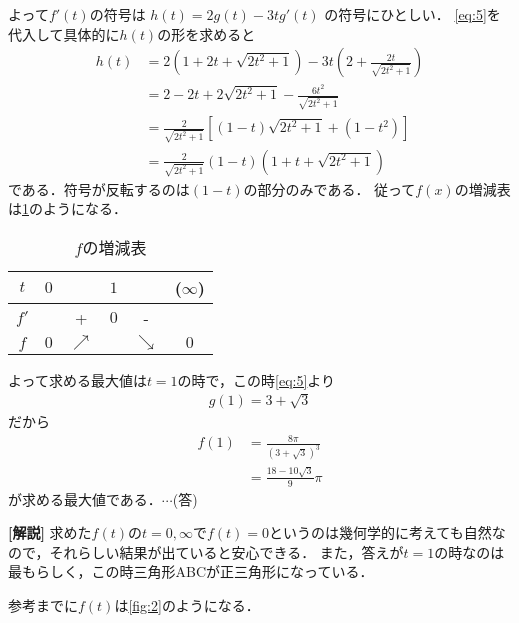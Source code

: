 \documentclass[a4paper,10pt]{ltjsarticle}
\begin{document}
\begin{multicols}{2}
  よって$f'(t)$の符号は $h(t)=2 g(t) - 3t g'(t)$ の符号にひとしい．
  \cref{eq:5}を代入して具体的に$h(t)$の形を求めると
  \begin{align*}
    h(t) & = 2(1+2t+\sqrt{2t^2+1}) - 3t\left(2 + \frac{2t}{\sqrt{2t^2+1}}\right)   \\
         & = 2-2t + 2\sqrt{2t^2+1} - \frac{6t^2}{\sqrt{2t^2+1}}                    \\
         & = \frac{2}{\sqrt{2t^2+1}} \left[ (1-t)\sqrt{2t^2+1} + (1-t^2)\right]    \\
         & = \frac{2}{\sqrt{2t^2+1}}\left(1-t\right)\left(1+t+\sqrt{2t^2+1}\right)
  \end{align*}
  である．符号が反転するのは$(1-t)$の部分のみである．
  従って$f(x)$の増減表は\cref{table:1}のようになる．
  \begin{table}[H]
    \centering
    \caption{$f$の増減表}
    \label{table:1}
    \begin{tabular}{|c||c|c|c|c|c|}
      \hline
      $t$  & $0$ &            & $1$ &            & ($\infty$) \\
      \hline
      $f'$ &     & +          & $0$ & -          &            \\
      \hline
      $f$  & $0$ & $\nearrow$ &     & $\searrow$ & $0$        \\
      \hline
    \end{tabular}
  \end{table}
  よって求める最大値は$t=1$の時で，この時\cref{eq:5}より
  \begin{align*}
    g(1)=3+\sqrt{3}
  \end{align*}
  だから
  \begin{align*}
    f(1)
     & = \frac{8\pi}{(3+\sqrt{3})^3} \\
     & = \frac{18-10\sqrt{3}}{9}\pi
  \end{align*}
  が求める最大値である．$\cdots$(答)


  \vspace{10pt}
  {\bf[解説]}
  求めた$f(t)$の$t=0,\infty$で$f(t)=0$というのは幾何学的に考えても自然なので，それらしい結果が出ていると安心できる．
  また，答えが$t=1$の時なのは最もらしく，この時三角形ABCが正三角形になっている．

  参考までに$f(t)$は\cref{fig:2}のようになる．


\end{multicols}
\end{document}
